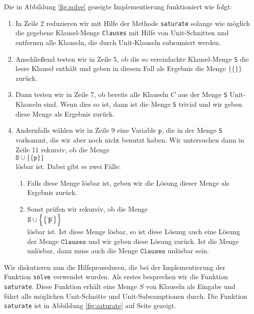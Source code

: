 Die in Abbildung \ref{fig:solve} gezeigte Implementierung funktioniert wie folgt:
\begin{enumerate}
\item In Zeile 2 reduzieren wir mit Hilfe der Methode \texttt{saturate} 
      solange wie möglich die gegebene Klausel-Menge \texttt{Clauses} mit Hilfe
      von Unit-Schnitten und entfernen alle Klauseln, die durch Unit-Klauseln
      subsumiert werden.
\item Anschließend testen wir in Zeile 5, ob die so vereinfachte Klausel-Menge \texttt{S}
      die leere Klausel enthält und geben in diesem Fall als Ergebnis die Menge 
      $\bigl\{\{\}\bigr\}$ zurück.
\item Dann testen wir in Zeile 7, ob bereits alle Klauseln $C$ aus der Menge
      \texttt{S} Unit-Klauseln sind.  Wenn dies so ist,
      dann ist die Menge \texttt{S} trivial und wir geben diese Menge als Ergebnis zurück.
\item Andernfalls wählen wir in Zeile 9 eine Variable $\texttt{p}$, die in der Menge \texttt{S} vorkommt, 
      die wir aber noch nicht benutzt haben.
      Wir untersuchen dann in Zeile 11 rekursiv, ob die Menge \\[0.2cm]
      \hspace*{1.3cm} 
      $\texttt{S} \cup \bigl\{\{\texttt{p}\}\bigr\}$ 
      \\[0.2cm]
      lösbar ist.  Dabei gibt es zwei Fälle:
      \begin{enumerate}
      \item Falls diese Menge lösbar ist, geben wir die Lösung dieser Menge als Ergebnis zurück.

      \item Sonst prüfen wir rekursiv, ob die Menge 
            \\[0.2cm]
            \hspace*{1.3cm}
            $\texttt{S} \cup \Bigl\{ \bigl\{ \overline{\,\texttt{p}\,} \bigr\} \Bigr\}$ 
            \\[0.2cm]
            lösbar ist.  Ist diese Menge lösbar, so ist diese Lösung auch eine
            Lösung der Menge $\texttt{Clauses}$ und wir geben diese Lösung zurück.  Ist die
            Menge unlösbar, dann muss auch die Menge $\texttt{Clauses}$ unlösbar sein.
      \end{enumerate}
\end{enumerate}

Wir diskutieren nun die Hilfsprozeduren, die bei der Implementierung der Funktion
\texttt{solve} verwendet wurden.
Als erstes besprechen wir die Funktion \texttt{saturate}.  Diese Funktion erhält eine
Menge $S$ von Klauseln als Eingabe und führt alle möglichen Unit-Schnitte und
Unit-Subsumptionen durch.  
Die Funktion \texttt{saturate} ist in Abbildung \ref{fig:saturate} auf Seite \pageref{fig:saturate}
gezeigt.

